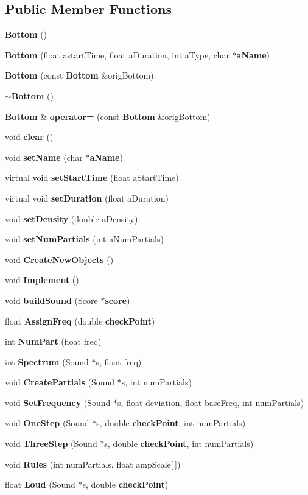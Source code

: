 \subsection*{Public Member Functions}
\begin{CompactItemize}
\item 
{\bf Bottom} ()
\item 
{\bf Bottom} (float astart\-Time, float a\-Duration, int a\-Type, char $\ast${\bf a\-Name})
\item 
{\bf Bottom} (const  {\bf Bottom} \&orig\-Bottom)
\item 
{\bf $\sim$Bottom} ()
\item 
{\bf Bottom} \& {\bf operator=} (const  {\bf Bottom} \&orig\-Bottom)
\item 
void {\bf clear} ()
\item 
void {\bf set\-Name} (char $\ast${\bf a\-Name})
\item 
virtual void {\bf set\-Start\-Time} (float a\-Start\-Time)
\item 
virtual void {\bf set\-Duration} (float a\-Duration)
\item 
void {\bf set\-Density} (double a\-Density)
\item 
void {\bf set\-Num\-Partials} (int a\-Num\-Partials)
\item 
void {\bf Create\-New\-Objects} ()
\item 
void {\bf Implement} ()
\item 
void {\bf build\-Sound} (Score $\ast${\bf score})
\item 
float {\bf Assign\-Freq} (double {\bf check\-Point})
\item 
int {\bf Num\-Part} (float freq)
\item 
int {\bf Spectrum} (Sound $\ast$s, float freq)
\item 
void {\bf Create\-Partials} (Sound $\ast$s, int num\-Partials)
\item 
void {\bf Set\-Frequency} (Sound $\ast$s, float deviation, float base\-Freq, int num\-Partials)
\item 
void {\bf One\-Step} (Sound $\ast$s, double {\bf check\-Point}, int num\-Partials)
\item 
void {\bf Three\-Step} (Sound $\ast$s, double {\bf check\-Point}, int num\-Partials)
\item 
void {\bf Rules} (int num\-Partials, float amp\-Scale[$\,$])
\item 
float {\bf Loud} (Sound $\ast$s, double {\bf check\-Point})
\item 

\end{CompactItemize}
